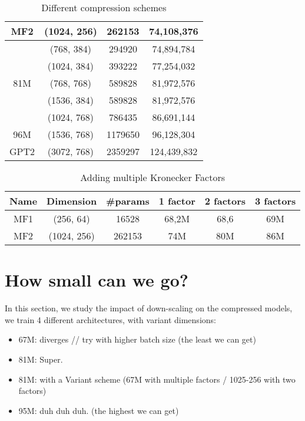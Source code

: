 \documentclass{article}
\begin{document}
{\begin{table}[htb!]
\begin{tabular}{|c|c|c|c|}
MF2		&  (1024, 256)      &   262153     & 74,108,376  \\ \hline 
		&  (768, 384)       &   294920     & 74,894,784  \\ \hline
		&  (1024, 384)      &   393222     & 77,254,032  \\ \hline
81M 	&  (768, 768)       &   589828     & 81,972,576  \\ \hline
		&  (1536, 384)      &   589828     & 81,972,576  \\ \hline
		&  (1024, 768)      &   786435     & 86,691,144  \\ \hline
96M		&  (1536, 768)      &   1179650    & 96,128,304  \\ \hline
GPT2	&  (3072, 768)      &   2359297    & 124,439,832 \\ \hline
\end{tabular}
\caption{Different compression schemes}
\end{table}



\begin{table}[htb!]
\centering
\begin{tabular}{|c|c|c|c|c|c|}
\hline
Name 	& Dimension 		& 	#params    & 1 factor    & 2 factors   & 3 factors     \\ \hline                                                                                 
MF1		&  (256, 64)        &   16528      & 68,2M       & 68,6  & 69M    \\ \hline
MF2		&  (1024, 256)      &   262153     & 74M         & 80M   & 86M    \\ \hline 
\end{tabular}
\caption{Adding multiple Kronecker Factors}
\end{table}


\newpage
\section{How small can we go?}%
\label{sub:get-down}

In this section, we study the impact of down-scaling on the compressed models, we train 4 different architectures, with variant dimensions:

\begin{itemize}
	\item 67M: diverges // try with higher batch size (the least we can get)
	\item 81M: Super.
	\item 81M: with a Variant scheme (67M with multiple factors / 1025-256 with  two factors)
	\item 95M: duh duh duh. (the highest we can get)
\end{itemize}

}
\end{document}
